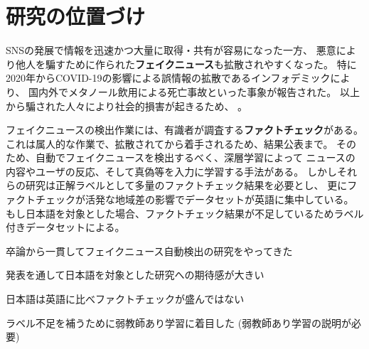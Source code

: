 
\section{研究の位置づけ}

SNSの発展で情報を迅速かつ大量に取得・共有が容易になった一方、
悪意により他人を騙すために作られた\textbf{フェイクニュース}も拡散されやすくなった。
特に2020年からCOVID-19の影響による誤情報の拡散であるインフォデミックにより、
国内外でメタノール飲用による死亡事故\cite{iraninfo}といった事象が報告された。
以上から騙された人々により社会的損害が起きるため、
\cite{snsinfo}。

フェイクニュースの検出作業には、有識者が調査する\textbf{ファクトチェック}がある。
これは属人的な作業で、拡散されてから着手されるため、結果公表まで。
そのため、自動でフェイクニュースを検出するべく、深層学習によって
ニュースの内容やユーザの反応、そして真偽等を入力に学習する手法がある。
しかしそれらの研究は正解ラベルとして多量のファクトチェック結果を必要とし、
更にファクトチェックが活発な地域差の影響でデータセットが英語に集中している。
もし日本語を対象とした場合、ファクトチェック結果が不足しているためラベル付きデータセットによる。

卒論から一貫してフェイクニュース自動検出の研究をやってきた

発表を通して日本語を対象とした研究への期待感が大きい

日本語は英語に比べファクトチェックが盛んではない

ラベル不足を補うために弱教師あり学習に着目した
(弱教師あり学習の説明が必要)

